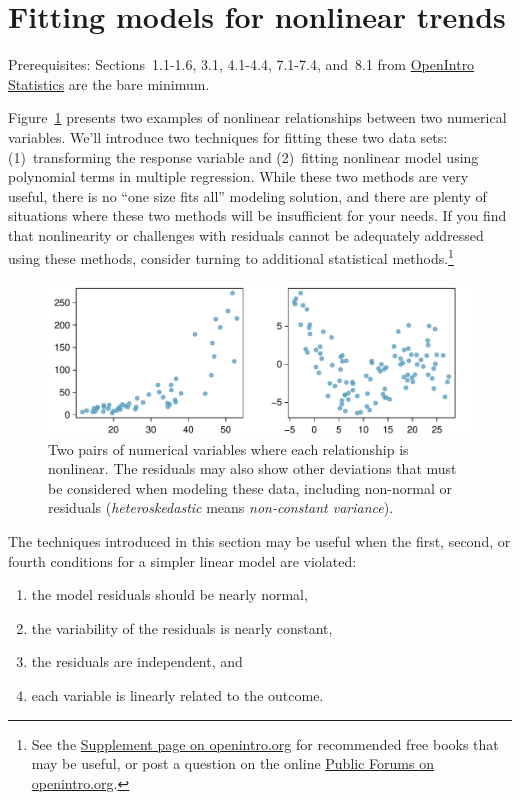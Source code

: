 

\pagebreak
\section*{Fitting models for nonlinear trends}

Prerequisites: Sections~1.1-1.6, 3.1, 4.1-4.4, 7.1-7.4, and~8.1 from \href{http://www.openintro.org/stat/textbook.php}{OpenIntro Statistics} are the bare minimum.

Figure~\ref{nonlinear} presents two examples of nonlinear relationships between two numerical variables. We'll introduce two techniques for fitting these two data sets: (1)~transforming the response variable and (2)~fitting nonlinear model using polynomial terms in multiple regression. While these two methods are very useful, there is no ``one size fits all'' modeling solution, and there are plenty of situations where these two methods will be insufficient for your needs. If you find that nonlinearity or challenges with residuals cannot be adequately addressed using these methods, consider turning to additional statistical methods.\footnote{See the \href{http://www.openintro.org/stat/supplements.php?feature=regression_online_extra_more_free_books}{Supplement page on openintro.org} for recommended free books that may be useful, or post a question on the online \href{http://www.openintro.org/stat/forums.php}{Public Forums on openintro.org}.}

\begin{figure}[h]
\centering
\includegraphics[width=\textwidth]{RegressionExtras/figures/nonlinear/nonlinear} 
\caption{Two pairs of numerical variables where each relationship is nonlinear. The residuals may also show other deviations that must be considered when modeling these data, including non-normal or  residuals (\emph{heteroskedastic} means \emph{non-constant variance}).}
\label{nonlinear}
\end{figure}

The techniques introduced in this section may be useful when the first, second, or fourth conditions for a simpler linear model are violated:
\begin{enumerate}
\setlength{\itemsep}{0mm}
\item the model residuals should be nearly normal,
\item the variability of the residuals is nearly constant,
\item the residuals are independent, and
\item each variable is linearly related to the outcome.
\end{enumerate}


